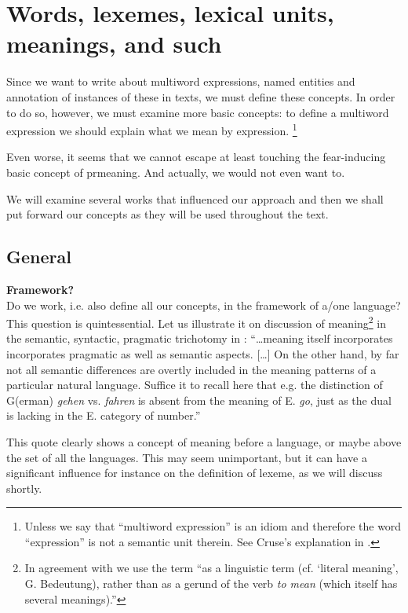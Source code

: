 
\chapter{Words, lexemes, lexical units, meanings, and such}
%

Since we want to write about multiword expressions, named entities and annotation of instances of these in texts, we must define these concepts. In order to do so, however, we must examine more basic concepts: to define a multiword expression we should explain what we mean by expression. %
\footnote{Unless we say that ``multiword expression'' is an idiom and therefore the word ``expression'' is not a semantic unit therein. See Cruse's explanation in .
} %

Even worse, it seems  that we cannot escape at least touching the fear-inducing basic concept of pr{meaning}. And actually, we would not even want to. 

We will examine several works that influenced our approach and then we shall put forward our concepts as they will be used throughout the text.

\section{General}
\textbf{Framework?}\\
Do we work, i.e. also define all our concepts, in the framework of a/one language? This question is quintessential. Let us illustrate it on discussion of meaning\footnote{In agreement with \citet{sgall-etal:1986} we use the term ``as a linguistic term (cf. `literal meaning', G. Bedeutung), rather than as a gerund of the verb \emph{to mean} (which itself has several meanings).''} in the semantic, syntactic, pragmatic trichotomy in \citet{sgall-etal:1986}: ``\ldots meaning itself incorporates incorporates pragmatic as well as semantic aspects. [\ldots] On the other hand, by far not all semantic differences are overtly included in the meaning patterns of a particular natural language. Suffice it to recall here that e.g. the distinction of G(erman) \emph{gehen} vs. \emph{fahren} is absent from the meaning of E. \emph{go}, just as the dual is lacking in the E. category of number.''

This quote clearly shows a concept of meaning before a language, or maybe above the set of all the languages. This may seem unimportant, but it can have a significant influence for instance on the definition of lexeme, as we will discuss shortly.

